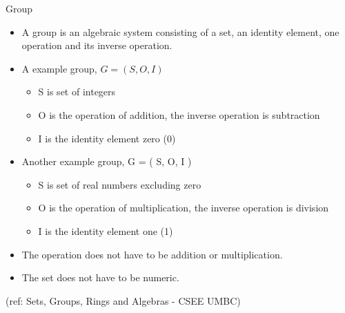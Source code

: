 \begin{frame}{Group}
\begin{itemize}
\item  A group is an algebraic system consisting of a set, an identity element,
  one operation and its inverse operation.
\item A example group, $G = ( S, O, I )$

	\begin{itemize}
	\item  S is set of integers
	\item O is the operation of addition, the inverse operation is subtraction
	\item I is the identity element zero (0)
	\end{itemize}
	
\item Another example group, G = ( S, O, I )

	\begin{itemize}
	\item  S is set of real numbers excluding zero
	\item O is the operation of multiplication, the inverse operation is division
	\item I is the identity element one (1)
	\end{itemize}	
	
\item   The operation does not have to be addition or multiplication.
\item   The set does not have to be numeric.	
\end{itemize}

\tiny{(ref: Sets, Groups, Rings and Algebras - CSEE UMBC)}

\end{frame}


